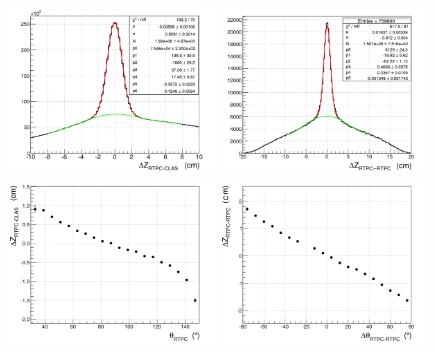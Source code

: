 \documentclass[amsmath,amssymb,notitlepage,11pt]{revtex4-1}
\begin{document}
\begin{figure}[htbp]\centering
    \includegraphics[width=0.49\textwidth]{pics/dvzRTPC-CLAS_small.png}
    \includegraphics[width=0.49\textwidth]{pics/dvzRTPC-RTPC_small.png}
    \includegraphics[width=0.49\textwidth]{pics/dvzRTPC-CLAS_vs_theta_small.png}
    \includegraphics[width=0.49\textwidth]{pics/dvzRTPC-RTPC_vs_dtheta_small2.png}

\end{figure}
\end{document}
